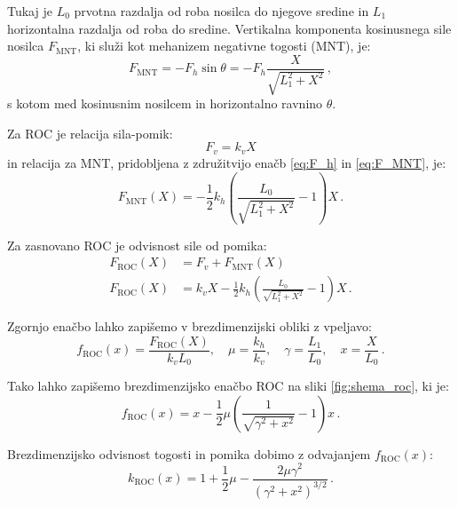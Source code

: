         Tukaj je $L_0$ prvotna razdalja od roba nosilca do njegove sredine in $L_1$ horizontalna razdalja od roba do sredine. Vertikalna komponenta kosinusnega sile nosilca $F_{\mathrm{MNT}}$, ki služi kot mehanizem negativne togosti (MNT), je:
        \begin{equation}\label{eq:F_MNT}
            F_{\mathrm{MNT}}=-F_h \sin \theta = - F_{h} \frac{X}{\sqrt{L_1^2+X^2}}\,,
        \end{equation}
        s kotom med kosinusnim nosilcem in horizontalno ravnino $\theta$.
        
        Za ROC je relacija sila-pomik: 
        \begin{equation}
            F_v= k_v X 
        \end{equation}
        in relacija za MNT, pridobljena z združitvijo enačb \eqref{eq:F_h} in \eqref{eq:F_MNT}, je:
        \begin{equation}
            F_{\mathrm{MNT}}(X)=-\frac{1}{2} k_h\left(\frac{L_0}{\sqrt{L_1^2+X^2}}-1\right) X \,.
        \end{equation}
        
        Za zasnovano ROC je odvisnost sile od pomika:
        \begin{equation}\label{eq:F-ROC}
            \begin{aligned}
            F_{\mathrm{ROC}}(X)&=F_v+F_{\mathrm{MNT}}(X) \,\\
            F_{\mathrm{ROC}}(X)&= k_v X-\frac{1}{2} k_h\left(\frac{L_0}{\sqrt{L_1^2+X^2}}-1\right) X\,.
            \end{aligned}
        \end{equation}
        
        Zgornjo enačbo lahko zapišemo v brezdimenzijski obliki z vpeljavo:
        \begin{equation}
            f_{\mathrm{ROC}}(x)=\frac{F_{\mathrm{ROC}}(X)}{k_v L_0}, \quad \mu=\frac{k_h}{k_v}, \quad \gamma=\frac{L_1}{L_0}, \quad x=\frac{X}{L_0} \,.
        \end{equation}
        
        Tako lahko zapišemo brezdimenzijsko enačbo ROC na sliki \ref{fig:shema_roc}, ki je:
        \begin{equation}\label{eq:brezdimenzijski_f(x)}
            f_{\mathrm{ROC}}(x)= x- \frac{1}{2} \mu\left(\frac{1}{\sqrt{\gamma^2+x^2}}-1\right) x \,.
        \end{equation}
        
        Brezdimenzijsko odvisnost togosti in pomika dobimo z odvajanjem $f_{\mathrm{ROC}}(x)$: 
        \begin{equation}
            k_{\mathrm{ROC}}(x)=1 + \frac{1}{2} \mu - \frac{2 \mu \gamma^2}{(\gamma^2+x^2)^{3/2}}\,.
        \end{equation}
        

